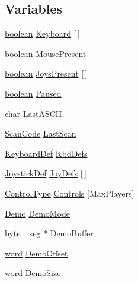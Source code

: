 \subsection*{Variables}
\begin{DoxyCompactItemize}
\item 
\hyperlink{ID__HEAD_8H_a7c6368b321bd9acd0149b030bb8275ed}{boolean} \hyperlink{ID__IN_8H_a738773813b02543208fabb69caadefd9}{Keyboard} \mbox{[}$\,$\mbox{]}
\item 
\hyperlink{ID__HEAD_8H_a7c6368b321bd9acd0149b030bb8275ed}{boolean} \hyperlink{ID__IN_8H_acfbb4437bdf4555f53ac0b13925b6d32}{MousePresent}
\item 
\hyperlink{ID__HEAD_8H_a7c6368b321bd9acd0149b030bb8275ed}{boolean} \hyperlink{ID__IN_8H_aff444f013e2394c2c15c5e46ab24d585}{JoysPresent} \mbox{[}$\,$\mbox{]}
\item 
\hyperlink{ID__HEAD_8H_a7c6368b321bd9acd0149b030bb8275ed}{boolean} \hyperlink{ID__IN_8H_a8bb9401d8f4d8323faee50f94a4be7b5}{Paused}
\item 
char \hyperlink{ID__IN_8H_ae0bac1d5b862fc73354b6992e25e9207}{LastASCII}
\item 
\hyperlink{ID__IN_8H_a92ee9291fc7e992c1662c4e195242f2d}{ScanCode} \hyperlink{ID__IN_8H_a294d54f35598c13b2caa8bee664743a4}{LastScan}
\item 
\hyperlink{structKeyboardDef}{KeyboardDef} \hyperlink{ID__IN_8H_a27c5715e087f17739848d747929a11ae}{KbdDefs}
\item 
\hyperlink{structJoystickDef}{JoystickDef} \hyperlink{ID__IN_8H_ae9a67b60e05d6d05152b6e9d21f75529}{JoyDefs} \mbox{[}$\,$\mbox{]}
\item 
\hyperlink{ID__IN_8H_a8005f1f182fd0248a710ca64f72508d4}{ControlType} \hyperlink{ID__IN_8H_a9cf23a083833e7437416b3a0fedae789}{Controls} \mbox{[}MaxPlayers\mbox{]}
\item 
\hyperlink{ID__IN_8H_aee6aa8565f29397f3cdc22bf15ba6763}{Demo} \hyperlink{ID__IN_8H_a3f08b9ae9c5b54f2990ec177babb74ef}{DemoMode}
\item 
\hyperlink{ID__HEAD_8H_a0c8186d9b9b7880309c27230bbb5e69d}{byte} \_\-seg $\ast$ \hyperlink{ID__IN_8H_ab667a009823ca43974aa23e0ed2e2d33}{DemoBuffer}
\item 
\hyperlink{ID__HEAD_8H_abad51e07ab6d26bec9f1f786c8d65bcd}{word} \hyperlink{ID__IN_8H_a0e890514eba321a0ca518018964e3a63}{DemoOffset}
\item 
\hyperlink{ID__HEAD_8H_abad51e07ab6d26bec9f1f786c8d65bcd}{word} \hyperlink{ID__IN_8H_a8486d18dcabfa7a32dc114edc70ae0c6}{DemoSize}
\end{DoxyCompactItemize}



